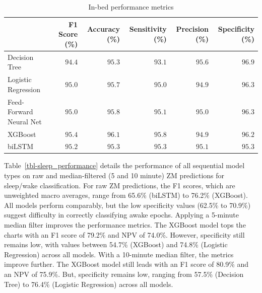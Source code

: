\documentclass[
  super,
  preprint,
  3p]{elsarticle}
\begin{document}
\hypertarget{tbl-in_bed_performance}{}
\begin{longtable}{lrrrrr}
\caption{\label{tbl-in_bed_performance}In-bed performance metrics }\tabularnewline

\toprule
 & F1 Score (\%) & Accuracy (\%) & Sensitivity (\%) & Precision (\%) & Specificity (\%) \\ 
\midrule
Decision Tree & $94.4$ & $95.3$ & $93.1$ & $95.6$ & $96.9$ \\ 
Logistic Regression & $95.0$ & $95.7$ & $95.0$ & $94.9$ & $96.3$ \\ 
Feed-Forward Neural Net & $95.0$ & $95.8$ & $95.1$ & $95.0$ & $96.3$ \\ 
XGBoost & $95.4$ & $96.1$ & $95.8$ & $94.9$ & $96.2$ \\ 
biLSTM & $95.2$ & $95.3$ & $95.3$ & $95.1$ & $95.3$ \\ 
\bottomrule
\end{longtable}

Table~\ref{tbl-sleep_performance} details the performance of all
sequential model types on raw and median-filtered (5 and 10 minute) ZM
predictions for sleep/wake classification. For raw ZM predictions, the
F1 scores, which are unweighted macro averages, range from 65.6\%
(biLSTM) to 76.2\% (XGBoost). All models perform comparably, but the low
specificity values (62.5\% to 70.9\%) suggest difficulty in correctly
classifying awake epochs. Applying a 5-minute median filter improves the
performance metrics. The XGBoost model tops the charts with an F1 score
of 79.2\% and NPV of 74.0\%. However, specificity still remains low,
with values between 54.7\% (XGBoost) and 74.8\% (Logistic Regression)
across all models. With a 10-minute median filter, the metrics improve
further. The XGBoost model still leads with an F1 score of 80.9\% and an
NPV of 75.9\%. But, specificity remains low, ranging from 57.5\%
(Decision Tree) to 76.4\% (Logistic Regression) across all models.
\end{document}
